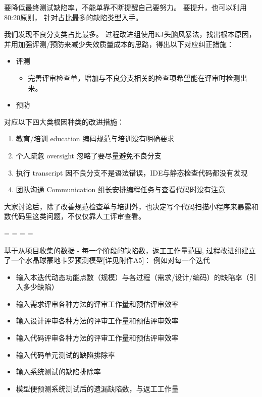 要降低最终测试缺陷率，不能单靠不断提醒自己要努力。
要提升，也可以利用80:20原则， 针对占比最多的缺陷类型入手。

我们发现不良分支类占比最多。
过程改进组使用KJ头脑风暴法，找出根本原因，并用加强评测/预防来减少失效质量成本的思路，得出以下对应纠正措施：

\begin{itemize}
\tightlist
\item
  评测

  \begin{itemize}
  \tightlist
  \item
    完善评审检查单，增加与不良分支相关的检查项希望能在评审时检测出来。
  \end{itemize}
\end{itemize}

\begin{itemize}
\tightlist
\item
  预防
\end{itemize}

\begin{description}
\tightlist
\item[]
对应以下四大类根因种类的改进措施：
\end{description}

\begin{enumerate}
\tightlist
\item
  教育/培训 education 编码规范与培训没有明确要求
\item
  个人疏忽 oversight 忽略了要尽量避免不良分支
\item
  执行 transcript 因不良分支不是语法错误，IDE与静态检查代码都没有发现
\item
  团队沟通 Communication 组长安排编程任务与查看代码时没有注意
\end{enumerate}

大家讨论后，除了改善规范检查单与培训外，也决定写个代码扫描小程序来暴露和数代码里这类问题，不仅仅靠人工评审查看。

\begin{description}
\tightlist
\item[]
= = = =
\end{description}

基于从项目收集的数据 - 每一个阶段的缺陷数，返工工作量范围,
过程改进组建立了一个水晶球蒙地卡罗预测模型{[}详见附件A5{]}：
例如对每一个迭代

\begin{itemize}
\tightlist
\item
  输入本迭代动态功能点数（规模）与各过程（需求/设计/编码）的缺陷率（引入多少缺陷）
\item
  输入需求评审各种方法的评审工作量和预估评审效率
\item
  输入设计评审各种方法的评审工作量和预估评审效率
\item
  输入代码评审各种方法的评审工作量和预估评审效率
\item
  输入代码单元测试的缺陷排除率
\item
  输入系统测试的缺陷排除率
\item
  模型便预测系统测试后的遗漏缺陷数，与返工工作量
\end{itemize}

